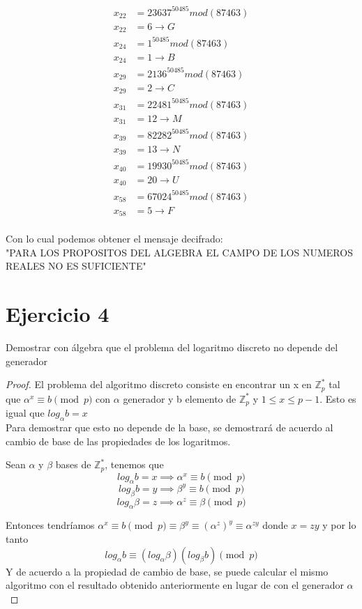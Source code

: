 \documentclass[12pt, letterpaper]{article}
\begin{document}
\begin{itemize}
\begin{equation*}
\begin{split}
x_{22}&=23637^{50485} mod (87463)\\x_{22}&=6\rightarrow G\\
x_{24}&=1^{50485} mod (87463)\\x_{24}&=1\rightarrow B\\
x_{29}&=2136^{50485} mod (87463)\\x_{29}&=2\rightarrow C\\
x_{31}&=22481^{50485} mod (87463)\\x_{31}&=12\rightarrow M\\
x_{39}&=82282^{50485} mod (87463)\\x_{39}&=13\rightarrow N\\
x_{40}&=19930^{50485} mod (87463)\\x_{40}&=20\rightarrow U\\
x_{58}&=67024^{50485} mod (87463)\\x_{58}&=5\rightarrow F\\
\end{split}
\end{equation*}

Con lo cual podemos obtener el mensaje decifrado:\\

"PARA LOS PROPOSITOS DEL ALGEBRA EL CAMPO DE LOS NUMEROS REALES NO ES SUFICIENTE"


\end{itemize}



\section*{Ejercicio 4}
Demostrar con álgebra que el problema del logaritmo discreto no depende del generador
\begin{proof}
El problema del algoritmo discreto consiste en encontrar un x en $\mathbb{Z}_p^*$ tal que $\alpha^x\equiv b \pmod{p}$ con $\alpha$ generador y b elemento de $\mathbb{Z}_p^*$ y $1\leq x \leq p-1$. Esto es igual que $log_{\alpha} b = x$
\\
Para demostrar que esto no depende de la base, se demostrará de acuerdo al cambio de base de las propiedades de los logaritmos.

Sean $\alpha$ y $\beta$  bases de $\mathbb{Z}_p^*$, tenemos que 
\[
log_{\alpha} b = x \implies  \alpha^x\equiv b \pmod{p}
\]
\[
log_{\beta} b = y \implies
\beta^y\equiv b \pmod{p}
\]
\[
log_{\alpha} \beta = z \implies \alpha^z\equiv \beta \pmod{p} 
\]

Entonces tendríamos $\alpha^x\equiv b \pmod{p} \equiv \beta^y \equiv (\alpha^z)^y \equiv \alpha^{zy}$ donde $x=zy$ y por lo tanto
\[
log_{\alpha} b\equiv \left(log_\alpha \beta\right) \left(log_\beta b\right) \pmod{ p}
\]
Y de acuerdo a la propiedad de cambio de base, se puede calcular el mismo algoritmo con el resultado obtenido anteriormente en lugar de con el generador $\alpha$
\end{proof}
\end{document}
